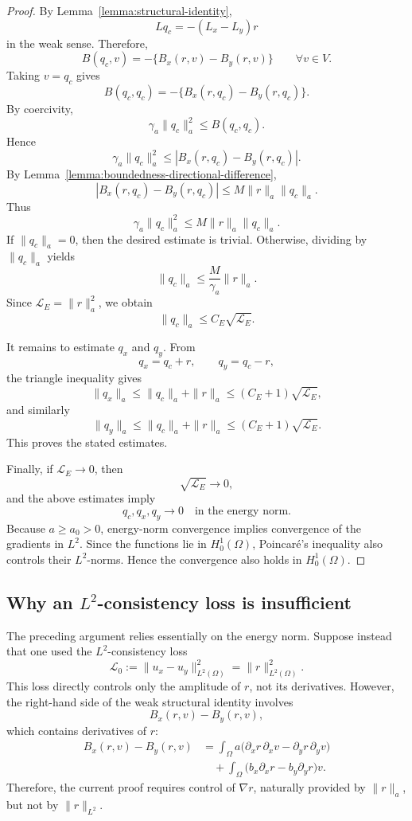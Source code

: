 \documentclass[11pt]{article}
\begin{document}
\begin{proof}
By Lemma~\ref{lemma:structural-identity},
\[
    Lq_c=-(L_x-L_y)r
\]
in the weak sense.  Therefore,
\begin{equation}
    B(q_c,v)
    =
    -\{B_x(r,v)-B_y(r,v)\}
    \qquad
    \forall v\in V.
    \label{eq:weak-form-structural-identity}
\end{equation}
Taking \(v=q_c\) gives
\[
    B(q_c,q_c)
    =
    -\{B_x(r,q_c)-B_y(r,q_c)\}.
\]
By coercivity,
\[
    \gamma_a\|q_c\|_a^2
    \le
    B(q_c,q_c).
\]
Hence
\[
    \gamma_a\|q_c\|_a^2
    \le
    |B_x(r,q_c)-B_y(r,q_c)|.
\]
By Lemma~\ref{lemma:boundedness-directional-difference},
\[
    |B_x(r,q_c)-B_y(r,q_c)|
    \le
    M\|r\|_a\|q_c\|_a.
\]
Thus
\[
    \gamma_a\|q_c\|_a^2
    \le
    M\|r\|_a\|q_c\|_a.
\]
If \(\|q_c\|_a=0\), then the desired estimate is trivial.  Otherwise,
dividing by \(\|q_c\|_a\) yields
\[
    \|q_c\|_a
    \le
    \frac{M}{\gamma_a}\|r\|_a.
\]
Since \(\mathcal L_E=\|r\|_a^2\), we obtain
\[
    \|q_c\|_a
    \le
    C_E\sqrt{\mathcal L_E}.
\]

It remains to estimate \(q_x\) and \(q_y\).  From
\[
    q_x=q_c+r,
    \qquad
    q_y=q_c-r,
\]
the triangle inequality gives
\[
    \|q_x\|_a
    \le
    \|q_c\|_a+\|r\|_a
    \le
    (C_E+1)\sqrt{\mathcal L_E},
\]
and similarly
\[
    \|q_y\|_a
    \le
    \|q_c\|_a+\|r\|_a
    \le
    (C_E+1)\sqrt{\mathcal L_E}.
\]
This proves the stated estimates.

Finally, if \(\mathcal L_E\to0\), then
\[
    \sqrt{\mathcal L_E}\to0,
\]
and the above estimates imply
\[
    q_c,q_x,q_y\to0
    \quad
    \text{in the energy norm}.
\]
Because \(a\ge a_0>0\), energy-norm convergence implies convergence of
the gradients in \(L^2\).  Since the functions lie in \(H_0^1(\Omega)\),
Poincaré's inequality also controls their \(L^2\)-norms.  Hence the
convergence also holds in \(H_0^1(\Omega)\).
\end{proof}

\subsection{Why an \(L^2\)-consistency loss is insufficient}
\label{subsec:L2-consistency-insufficient}

The preceding argument relies essentially on the energy norm.  Suppose
instead that one used the \(L^2\)-consistency loss
\[
    \mathcal L_0
    :=
    \|u_x-u_y\|_{L^2(\Omega)}^2
    =
    \|r\|_{L^2(\Omega)}^2.
\]
This loss directly controls only the amplitude of \(r\), not its
derivatives.  However, the right-hand side of the weak structural
identity involves
\[
    B_x(r,v)-B_y(r,v),
\]
which contains derivatives of \(r\):
\begin{align*}
    B_x(r,v)-B_y(r,v)
    &=
    \int_\Omega a
    \bigl(\partial_x r\,\partial_x v
          -\partial_y r\,\partial_y v\bigr)
    \\
    &\quad
    +
    \int_\Omega
    \bigl(b_x\partial_x r-b_y\partial_y r\bigr)v.
\end{align*}
Therefore, the current proof requires control of \(\nabla r\), naturally
provided by \(\|r\|_a\), but not by \(\|r\|_{L^2}\).
\end{document}
